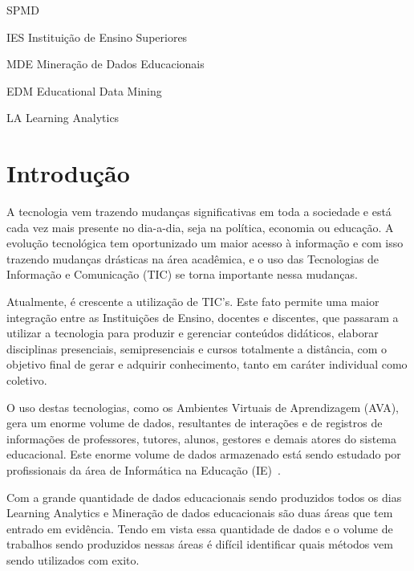 \documentclass[ti]{texufpel} %
\begin{document}
\begin{listofabbrv}{SPMD}
        \item[IES] Instituição de Ensino Superiores
        \item[MDE] Mineração de Dados Educacionais
        \item[EDM] Educational Data Mining
        \item[LA] Learning Analytics
\end{listofabbrv}

\tableofcontents

\chapter{Introdução}

A tecnologia vem trazendo mudanças significativas em toda a sociedade e está cada vez mais presente no dia-a-dia, seja na política, economia ou educação. A evolução tecnológica tem oportunizado um maior acesso à informação e com isso trazendo mudanças drásticas na área acadêmica, e o uso das Tecnologias de Informação e Comunicação (TIC) se torna importante nessa mudanças.

Atualmente, é crescente a utilização de TIC's. Este fato permite uma maior integração entre as Instituições de Ensino, docentes e discentes, que passaram a utilizar a tecnologia para produzir e gerenciar conteúdos didáticos, elaborar disciplinas presenciais, semipresenciais e cursos totalmente a distância, com o objetivo final de gerar e adquirir conhecimento, tanto em caráter individual como coletivo.

O uso destas tecnologias, como os Ambientes Virtuais de Aprendizagem (AVA), gera um enorme volume de dados, resultantes de interações e de registros de informações de professores, tutores, alunos, gestores e demais atores do sistema educacional. Este enorme volume de dados armazenado está sendo estudado por profissionais da área de Informática na Educação (IE)~\cite{santos2016analise}.

Com a grande quantidade de dados educacionais sendo produzidos todos os dias Learning Analytics e Mineração de dados educacionais são duas áreas que tem entrado em evidência. Tendo em vista essa quantidade de dados e o volume de trabalhos sendo produzidos nessas áreas é difícil identificar quais métodos vem sendo utilizados com exito.
\end{document}
